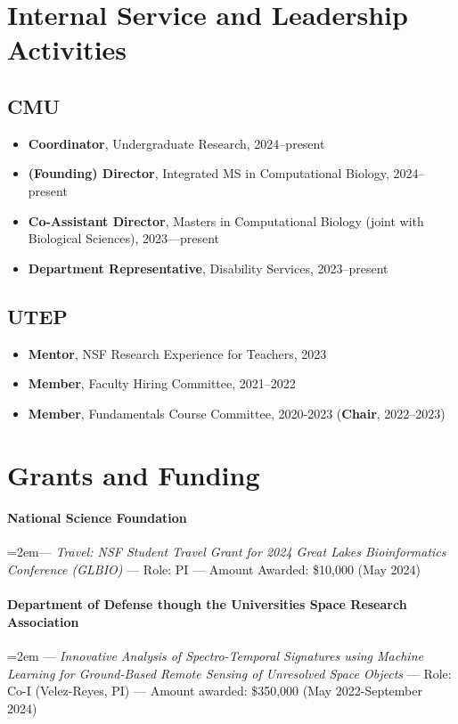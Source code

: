 \documentclass[10pt,letterpaper]{article}
\begin{document}
\section*{Internal Service and Leadership Activities}
\subsection*{CMU}
  \begin{itemize}
    \item \textbf{Coordinator}, Undergraduate Research, 2024--present
    \item \textbf{(Founding) Director}, Integrated MS in Computational Biology, 2024--present
    \item \textbf{Co-Assistant Director}, Masters in Computational Biology (joint with Biological Sciences), 2023---present
    \item \textbf{Department Representative}, Disability Services, 2023--present
  \end{itemize}
\subsection*{UTEP}
  \begin{itemize}
    \item \textbf{Mentor}, NSF Research Experience for Teachers, 2023
    \item \textbf{Member}, Faculty Hiring Committee, 2021--2022
    \item \textbf{Member}, Fundamentals Course Committee, 2020-2023 (\textbf{Chair}, 2022--2023)
    
  \end{itemize}

\section*{Grants and Funding}
\paragraph{National Science Foundation}  \hangindent=2em--- 
	\textit{Travel: NSF Student Travel Grant for 2024 Great Lakes Bioinformatics Conference (GLBIO)} ---
	Role: PI --- Amount Awarded: \$10,000 (May 2024)

\paragraph{Department of Defense though the Universities Space Research Association}   \hangindent=2em --- 
	\textit{Innovative Analysis of Spectro-Temporal Signatures using Machine Learning for Ground-Based Remote Sensing of Unresolved Space Objects} --- 
	Role: Co-I (Velez-Reyes, PI) --- Amount awarded: \$350,000 (May 2022-September 2024)
\end{document}
